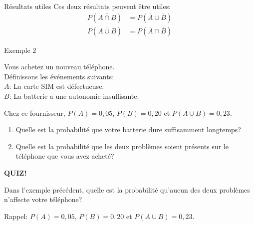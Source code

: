 \documentclass{BeamerTemplate}
\begin{document}
\begin{frame}[t]{Résultats utiles}
    Ces deux résultats peuvent être utiles:
    \begin{align*}
        P(\overline{A\cap B}) &= P(\overline{A} \cup \overline{B})\\
        P(\overline{A\cup B}) &= P(\overline{A} \cap \overline{B})
    \end{align*}
\end{frame}
\begin{frame}[t]{Exemple 2}

\begin{minipage}{8cm}{
\small
Vous achetez un nouveau téléphone. \\
Définissons les événements suivants:\\
$A$: La carte SIM est défectueuse.\\
$B$: La batterie a une autonomie insuffisante.\\
}
\end{minipage}

\vspace{.3cm}

Chez ce fournisseur, $P(A)=0,05$, $P(B)=0,20$ et $P(A \cup B)=0,23$.

\begin{enumerate}[{a)}]\itemsep1cm
  \item Quelle est la probabilité que votre batterie dure suffisamment longtemps?
  \item Quelle est la probabilité que les deux problèmes soient présents sur le téléphone que vous avez acheté?
\end{enumerate}
\end{frame}
\begin{frame}[plain,t]


\centerline{\LARGE\bf \alert{ QUIZ! }}

Dans l'exemple précédent, quelle est la probabilité qu'aucun des deux problèmes n'affecte votre téléphone?

 \bigskip



 \bigskip
Rappel:   $P(A)=0,05$, $P(B)=0,20$ et $P(A \cup B)=0,23$.
\vspace{3cm}

\end{frame}
\end{document}
